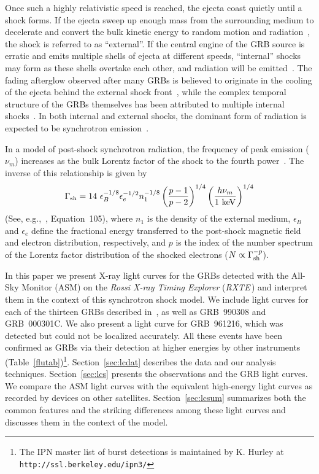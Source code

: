 \documentclass{aastex}
\def\rxte{{\it RXTE\,}}
\begin{document}
Once such a highly relativistic speed is reached, the ejecta coast
quietly until a shock forms.  If the ejecta sweep up enough mass from
the surrounding medium to decelerate and convert the bulk kinetic
energy to random motion and radiation~\citep{mr92,rm92}, the shock is
referred to as ``external''.  If the central engine of the GRB source
is erratic and emits multiple shells of ejecta at different speeds,
``internal'' shocks may form as these shells overtake each other, and
radiation will be emitted~\citep{kps97}.  The fading afterglow
observed after many GRBs is believed to originate in the cooling of
the ejecta behind the external shock front~\citep{mr97}, while the
complex temporal structure of the GRBs themselves has been attributed
to multiple internal shocks~\citep{npp92}.  In both internal and
external shocks, the dominant form of radiation is expected to be
synchrotron emission~\citep{snp96,piran99}.

In a model of post-shock synchrotron radiation, the frequency of peak
emission ($\nu_m$) increases as the bulk Lorentz factor of the shock
to the fourth power~\citep{snp96,spn98,wg99}.  The inverse of this
relationship is given by
\begin{equation}
\label{eq:peaklimgam}
\Gamma_{\rm sh} = 14\ \epsilon_B^{-1/8} \epsilon_e^{-1/2} n_1^{-1/8} 
\left( \frac{p-1}{p-2} \right)^{1/4}
\left( \frac{h \nu_m}{1\ {\rm keV}} \right)^{1/4}
\end{equation}
(See, e.g.,~\citet{piran99}, Equation~105), where $n_1$ is the density
of the external medium, $\epsilon_B$ and $\epsilon_e$ define the
fractional energy transferred to the post-shock magnetic field and
electron distribution, respectively, and $p$ is the index of the
number spectrum of the Lorentz factor distribution of the shocked
electrons ($N \propto \Gamma_{\rm sh}^{-p}$). 

In this paper we present X-ray light curves for the GRBs detected with
the All-Sky Monitor (ASM) on the {\it Rossi X-ray Timing Explorer}
({\it \rxte}) and interpret them in the context of this synchrotron
shock model.  We include light curves for each of the thirteen GRBs
described in~\citet{sblr99}, as well as GRB~990308 and GRB~000301C.
We also present a light curve for GRB~961216, which was detected but
could not be localized accurately.  All these events have been
confirmed as GRBs via their detection at higher energies by other
instruments (Table~\ref{flutab})\footnote{The IPN master list of burst
detections is maintained by K. Hurley at {\tt
http://ssl.berkeley.edu/ipn3/}}.  Section~\ref{sec:lcdat} describes
the data and our analysis techniques.  Section~\ref{sec:lcs} presents
the observations and the GRB light curves.  We compare the ASM light
curves with the equivalent high-energy light curves as recorded by
devices on other satellites.  Section~\ref{sec:lcsum} summarizes both
the common features and the striking differences among these light
curves and discusses them in the context of the model.
\end{document}
